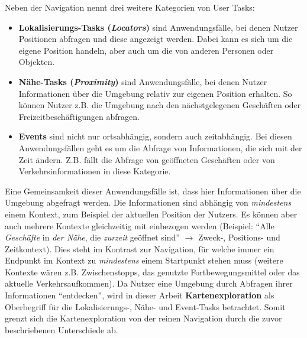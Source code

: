 Neben der Navigation nennt \citeauthor{Reichenbacher2001} drei weitere Kategorien von User Tasks:
\begin{itemize}
    \item \textbf{Lokalisierungs-Tasks (\emph{Locators})} sind Anwendungsfälle, bei denen Nutzer Positionen abfragen und diese angezeigt werden.
    Dabei kann es sich um die eigene Position handeln, aber auch um die von anderen Personen oder Objekten.
    
    \item \textbf{Nähe-Tasks (\emph{Proximity})} sind Anwendungsfälle, bei denen Nutzer Informationen über die Umgebung relativ zur eigenen Position erhalten.
    So können Nutzer z.B. die Umgebung nach den nächstgelegenen Geschäften oder Freizeitbeschäftigungen abfragen.
    
    \item \textbf{Events} sind nicht nur ortsabhängig, sondern auch zeitabhängig.
    Bei diesen Anwendungsfällen geht es um die Abfrage von Informationen, die sich mit der Zeit ändern.
    Z.B. fällt die Abfrage von geöffneten Geschäften oder von Verkehrsinformationen in diese Kategorie.
\end{itemize}

Eine Gemeinsamkeit dieser Anwendungsfälle ist, dass hier Informationen über die Umgebung abgefragt werden.
Die Informationen sind abhängig von \emph{mindestens} einem Kontext, zum Beispiel der aktuellen Position der Nutzers.
Es können aber auch mehrere Kontexte gleichzeitig mit einbezogen werden (Beispiel: \enquote{Alle \emph{Geschäfte} in \emph{der Nähe}, die \emph{zurzeit} geöffnet sind} $\rightarrow$ Zweck-, Positions- und Zeitkontext).
Dies steht im Kontrast zur Navigation, für welche immer ein Endpunkt im Kontext zu \emph{mindestens} einem Startpunkt stehen muss (weitere Kontexte wären z.B. Zwischenstopps, das genutzte Fortbewegungsmittel oder das aktuelle Verkehrsaufkommen).
Da Nutzer eine Umgebung durch Abfragen ihrer Informationen \enquote{entdecken}, wird in dieser Arbeit \textbf{Kartenexploration} als Oberbegriff für die Lokalisierungs-, Nähe- und Event-Tasks betrachtet.
Somit grenzt sich die Kartenexploration von der reinen Navigation durch die zuvor beschriebenen Unterschiede ab.

